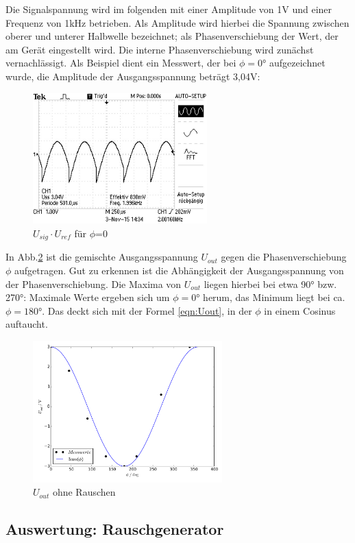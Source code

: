 Die Signalspannung wird im folgenden mit einer Amplitude von 1V und einer
Frequenz von 1kHz betrieben. Als Amplitude wird hierbei die Spannung zwischen
oberer und unterer Halbwelle bezeichnet; als Phasenverschiebung der Wert, der am
Gerät eingestellt wird. Die interne Phasenverschiebung wird zunächst
vernachlässigt. Als Beispiel dient ein Messwert, der bei $\phi = 0°$
aufgezeichnet wurde, die Amplitude der Ausgangsspannung beträgt 3,04V:
\begin{figure}[H]
  \centering
  \includegraphics[angle=90,height=0.3\textwidth,width=0.6\textwidth]
  {graphics/ALL0031/F0031TEK.jpg}
  \caption{$U_{sig} \cdot U_{ref}$ für $\phi$=0}
  \label{fig:2/phi0}
\end{figure}

In Abb.\ref{fig:plot2low} ist die gemischte Ausgangsspannung $U_{out}$ gegen die
Phasenverschiebung $\phi$ aufgetragen. Gut zu erkennen ist die Abhängigkeit
der Ausgangsspannung von der Phasenverschiebung. Die Maxima von $U_{out}$
liegen hierbei bei etwa 90° bzw. 270°:
Maximale Werte ergeben sich um $\phi = 0°$
herum, das Minimum liegt bei ca. $\phi = 180°$. Das deckt sich mit der Formel
\eqref{eqn:Uout}, in der $\phi$ in einem Cosinus auftaucht.
\begin{figure}[H]
  \centering
  \includegraphics[height=0.35\textwidth,width=0.65\textwidth]{plot2low.pdf}
  \caption{$U_{out}$ ohne Rauschen}
  \label{fig:plot2low}
\end{figure}


\subsection{Auswertung: Rauschgenerator}

